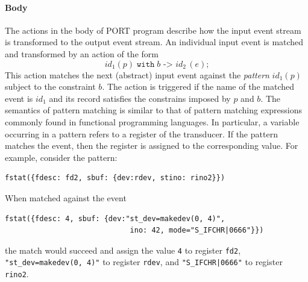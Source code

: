 \paragraph*{Body}
The actions in the body of PORT program describe how the input event stream is transformed to the output event stream. An individual input event is matched and transformed by an action of the form
\[\mathit{id}_1(p) \;\mathtt{with}\; b \texttt{ -> } \mathit{id}_2\,(e)\texttt{;}\]
This action matches the next (abstract) input event against the \emph{pattern} $\mathit{id}_1(p)$ subject to the constraint $b$. The action is triggered if the name of the matched event is $\mathit{id}_1$ and its record satisfies the constrains imposed by $p$ and $b$. The semantics of pattern matching is similar to that of pattern matching expressions commonly found in functional programming languages. In particular, a variable occurring in a pattern refers to a register of the transducer. If the pattern matches the event, then the register is assigned to the corresponding value. For example, consider the pattern:
\begin{lstlisting}[numbers=none,xleftmargin=0em,gobble=2]
  fstat({fdesc: fd2, sbuf: {dev:rdev, stino: rino2}})
\end{lstlisting}
When matched against the event
\begin{lstlisting}[numbers=none,xleftmargin=0em,gobble=2]
  fstat({fdesc: 4, sbuf: {dev:"st_dev=makedev(0, 4)",
                             ino: 42, mode="S_IFCHR|0666"}})
\end{lstlisting}
the match would succeed and assign the value \lstinline+4+ to register \lstinline+fd2+, \lstinline+"st_dev=makedev(0, 4)"+ to register \lstinline+rdev+, and \lstinline+"S_IFCHR|0666"+ to register \lstinline+rino2+.

